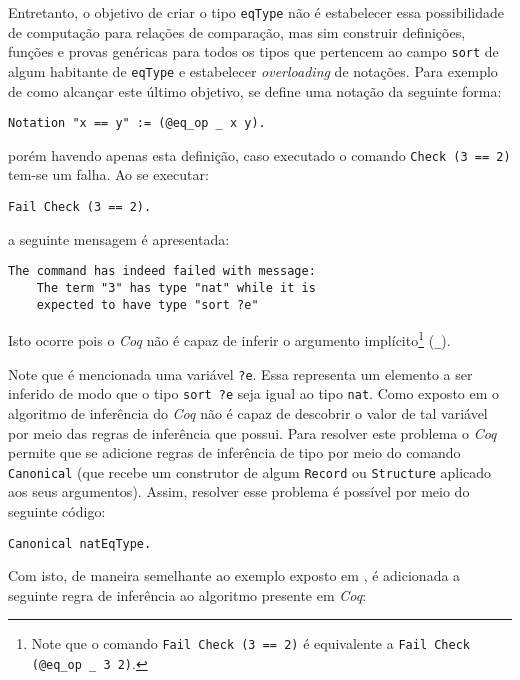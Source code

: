 Entretanto, o objetivo de criar o tipo \lstinline[language = coq]$eqType$ não é estabelecer essa possibilidade de computação para relações de comparação, mas sim construir definições, funções e provas genéricas para todos os tipos que pertencem ao campo \lstinline[language = coq]$sort$ de algum habitante de \lstinline[language = coq]$eqType$ e estabelecer \textit{overloading} de notações. Para exemplo de como alcançar este último objetivo, se define uma notação da seguinte forma:

\begin{lstlisting}[language = coq]
    Notation "x == y" := (@eq_op _ x y).
\end{lstlisting}
porém havendo apenas esta definição, caso executado o comando \lstinline[language = coq]$Check (3 == 2)$ tem-se um falha. Ao se executar:
\begin{lstlisting}[language = coq]
    Fail Check (3 == 2).
\end{lstlisting}
a seguinte mensagem é apresentada:
\begin{lstlisting}[language = coq-error]
    The command has indeed failed with message:
    The term "3" has type "nat" while it is 
    expected to have type "sort ?e"
\end{lstlisting}
Isto ocorre pois o \textit{Coq} não é capaz de inferir o argumento implícito\footnote{Note que o comando \lstinline[language = coq]$Fail Check (3 == 2)$ é equivalente a \lstinline[language = coq]$Fail Check (@eq_op _ 3 2)$.}  (\lstinline[language = coq]$_$).

Note que é mencionada uma variável \lstinline[language = coq]$?e$. Essa representa um elemento a ser inferido de modo que o tipo \lstinline[language = coq]$sort ?e$ seja igual ao tipo \lstinline[language = coq]$nat$. Como exposto em \cite{10.1007/978-3-642-39634-2_5} o algoritmo de inferência do \textit{Coq} não é capaz de descobrir o valor de tal variável por meio das regras de inferência que possui. Para resolver este problema 
o \textit{Coq} permite que se adicione regras de inferência de tipo por meio do comando \lstinline[language = coq]$Canonical$ (que recebe um construtor de algum \lstinline[language = coq]$Record$ ou \lstinline[language = coq]$Structure$ aplicado aos seus argumentos). Assim, resolver esse problema é possível por meio do seguinte código:
\begin{lstlisting}[language = coq]
    Canonical natEqType.
\end{lstlisting}
Com isto, de maneira semelhante ao exemplo exposto em \cite{10.1007/978-3-642-39634-2_5}, é adicionada a seguinte regra de inferência ao algoritmo presente em \textit{Coq}:

